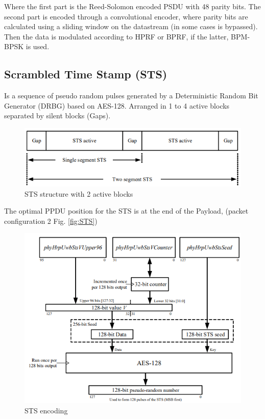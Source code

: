 \documentclass[conference]{IEEEtran}
\begin{document}
Where the first part is the Reed-Solomon encoded PSDU with 48 parity bits. The second part is
encoded through a convolutional encoder, where parity bits are calculated using a sliding 
window on the datastream (in some cases is bypassed). Then the data is modulated according to
HPRF or BPRF, if the latter, BPM-BPSK is used.

\subsection{Scrambled Time Stamp (STS)}
Is a sequence of pseudo random pulses generated by a Deterministic Random Bit Generator (DRBG)
based on AES-128. Arranged in 1 to 4 active blocks separated by silent blocks (Gaps).\\

\begin{figure}[!h]
  \centering
  \includegraphics[width=\linewidth]{STS-structure}
  \caption{STS structure with 2 active blocks}
  \label{fig:STS-structure}
\end{figure}

The optimal PPDU position for the STS is at the end of the Payload, (packet configuration 2 Fig.
\ref{fig:STS})\\

\begin{figure}[!h]
  \centering
  \includegraphics[width=\linewidth]{STS-encoding}
  \caption{STS encoding}
  \label{fig:STS-enc}
\end{figure}
\end{document}
